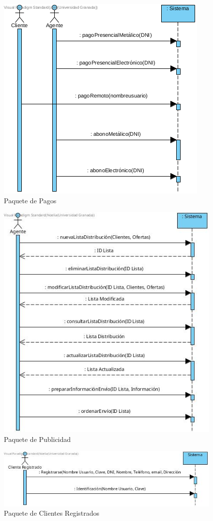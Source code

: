 \documentclass{article}
\begin{document}
	\begin{figure}[H]
		\centering
		\includegraphics[totalheight=12cm]{Pagos}
		\caption{Paquete de Pagos}
		\label{fig:p6}
	\end{figure}

	\begin{figure}[H]
		\centering
		\includegraphics[totalheight=12cm]{Paquete_7}
		\caption{Paquete de Publicidad}
		\label{fig:p7}
	\end{figure}

	\begin{figure}[H]
		\centering
		\includegraphics[totalheight=3cm]{Paquete_8}
		\caption{Paquete de Clientes Registrados}
		\label{fig:p8}
	\end{figure}
\end{document}
